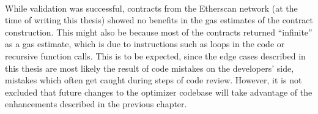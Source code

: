 \paragraph*{}
While validation was successful, contracts from the Etherscan network (at the time of writing this thesis) showed no benefits in the gas estimates of the contract construction. This might also be because most of the contracts returned ``infinite'' as a gas estimate, which is due to instructions such as loops in the code or recursive function calls. This is to be expected, since the edge cases described in this thesis are most likely the result of code mistakes on the developers' side, mistakes which often get caught during steps of code review. However, it is not excluded that future changes to the optimizer codebase will take advantage of the enhancements described in the previous chapter.
